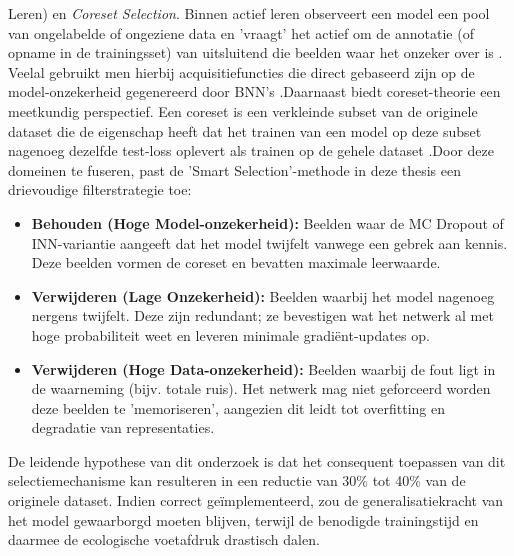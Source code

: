 Leren) en \textit{Coreset Selection}. Binnen actief leren observeert een model een pool van ongelabelde of ongeziene data en 'vraagt' het actief om de annotatie (of opname in de trainingsset) van uitsluitend die beelden waar het onzeker over is \autocite{settles2009active}. Veelal gebruikt men hierbij acquisitiefuncties die direct gebaseerd zijn op de model-onzekerheid gegenereerd door BNN's \autocite{houlsby2011bayesian}.Daarnaast biedt coreset-theorie een meetkundig perspectief. Een coreset is een verkleinde subset van de originele dataset die de eigenschap heeft dat het trainen van een model op deze subset nagenoeg dezelfde test-loss oplevert als trainen op de gehele dataset \autocite{sener2017active, mirzasoleiman2020coresets}.Door deze domeinen te fuseren, past de 'Smart Selection'-methode in deze thesis een drievoudige filterstrategie toe:\begin{itemize}\item \textbf{Behouden (Hoge Model-onzekerheid):} Beelden waar de MC Dropout of INN-variantie aangeeft dat het model twijfelt vanwege een gebrek aan kennis. Deze beelden vormen de coreset en bevatten maximale leerwaarde.\item \textbf{Verwijderen (Lage Onzekerheid):} Beelden waarbij het model nagenoeg nergens twijfelt. Deze zijn redundant; ze bevestigen wat het netwerk al met hoge probabiliteit weet en leveren minimale gradiënt-updates op.\item \textbf{Verwijderen (Hoge Data-onzekerheid):} Beelden waarbij de fout ligt in de waarneming (bijv. totale ruis). Het netwerk mag niet geforceerd worden deze beelden te 'memoriseren', aangezien dit leidt tot overfitting en degradatie van representaties.\end{itemize}De leidende hypothese van dit onderzoek is dat het consequent toepassen van dit selectiemechanisme kan resulteren in een reductie van 30\% tot 40\% van de originele dataset. Indien correct geïmplementeerd, zou de generalisatiekracht van het model gewaarborgd moeten blijven, terwijl de benodigde trainingstijd en daarmee de ecologische voetafdruk drastisch dalen.